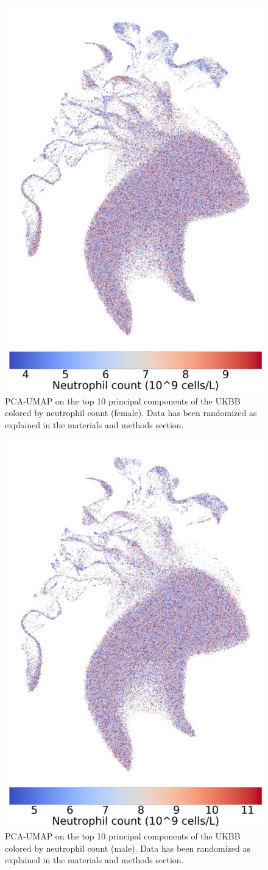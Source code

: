 \documentclass[12pt]{pnas-new}
\begin{document}
\begin{figure}
    \centering
    \includegraphics[width=0.4\columnwidth]{images/UKBB_UMAP_PC10_NN15_MD05_2018328174511_2018714165614_neutrophill_count_pct5_f.pdf}
    \caption{PCA-UMAP on the top 10 principal components of the UKBB colored by neutrophil count (female). Data has been randomized as explained in the materials and methods section.}
    \label{fig:supp_ukbb_neutrophill_f}
\end{figure}

\begin{figure}
    \centering
    \includegraphics[width=0.4\columnwidth]{images/UKBB_UMAP_PC10_NN15_MD05_2018328174511_2018714165614_neutrophill_count_pct5_m.pdf}
    \caption{PCA-UMAP on the top 10 principal components of the UKBB colored by neutrophil count (male). Data has been randomized as explained in the materials and methods section.}
    \label{fig:supp_ukbb_neutrophill_m}
\end{figure}
\end{document}
